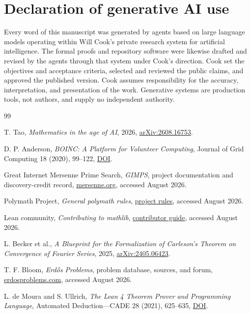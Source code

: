 \documentclass[10pt]{article}
\begin{document}
\section*{Declaration of generative AI use}
Every word of this manuscript was generated by agents based on large language
models operating within Will Cook's private research system for artificial
intelligence. The formal proofs and repository software were likewise drafted
and revised by the agents through that system under Cook's direction. Cook set
the objectives and acceptance criteria, selected and reviewed the public
claims, and approved the published version. Cook assumes responsibility for
the accuracy, interpretation, and presentation of the work. Generative systems
are production tools, not authors, and supply no independent authority.

\begin{thebibliography}{99}

T. Tao, \emph{Mathematics in the age of AI}, 2026,
\href{https://arxiv.org/abs/2608.16753}{arXiv:2608.16753}.

D. P. Anderson, \emph{BOINC: A Platform for Volunteer Computing}, Journal of
Grid Computing 18 (2020), 99--122,
\href{https://doi.org/10.1007/s10723-019-09497-9}{DOI}.

Great Internet Mersenne Prime Search, \emph{GIMPS}, project documentation and
discovery-credit record, \href{https://www.mersenne.org/}{mersenne.org},
accessed August 2026.

Polymath Project, \emph{General polymath rules},
\href{https://polymathprojects.org/general-polymath-rules/}{project rules},
accessed August 2026.

Lean community, \emph{Contributing to mathlib},
\href{https://leanprover-community.github.io/contribute/index.html}{contributor guide},
accessed August 2026.

L. Becker et al., \emph{A Blueprint for the Formalization of Carleson's
Theorem on Convergence of Fourier Series}, 2025,
\href{https://arxiv.org/abs/2405.06423}{arXiv:2405.06423}.

T. F. Bloom, \emph{Erd\H{o}s Problems}, problem database, sources, and forum,
\href{https://www.erdosproblems.com/}{erdosproblems.com},
accessed August 2026.

L. de Moura and S. Ullrich, \emph{The Lean 4 Theorem Prover and Programming
Language}, Automated Deduction---CADE 28 (2021), 625--635,
\href{https://doi.org/10.1007/978-3-030-79876-5_37}{DOI}.


\end{thebibliography}
\end{document}
